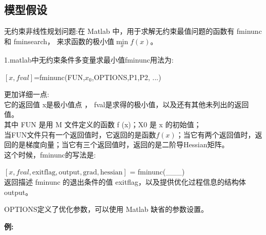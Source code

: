\documentclass[a4paper,20pt]{article}
\begin{document}
    \subsection{模型假设}
    无约束非线性规划问题:在 Matlab 中，用于求解无约束最值问题的函数有 fminunc 和 fminsearch，
    来求函数的极小值$\min\limits_x f(x)$。
    \par 1.matlab中无约束条件多变量求最小值fminunc用法为:
    \begin{center}
        $\left[x,fval\right]$=fminunc(FUN,$x_0$,OPTIONS,P1,P2, ...)
    \end{center}
    \par \noindent 更加详细一点:
    \\它的返回值 x是极小值点 ， fval是求得的极小值，以及还有其他未列出的返回值。
    \\其中 FUN 是用 M 文件定义的函数 f (x)；X0 是 x 的初始值；
    \\当FUN文件只有一个返回值时，它返回的是函数$f(x)$；当它有两个返回值时，返回的是梯度向量；当它有三个返回值时，返回的是二阶导Hessian矩阵。
    \\这个时候，fminunc的写法是:
    \begin{center}
        \par \noindent $\left[x,fval,\text{exitflag},\text{output},\text{grad},\text{hessian}\right]$  = fminunc(\_\_\_)
        \\返回描述 fminunc 的退出条件的值 exitflag，以及提供优化过程信息的结构体 output。
    \end{center}
    \par \noindent OPTIONS定义了优化参数，可以使用 Matlab 缺省的参数设置。
    \par \textbf{例:}
    \par \noindent {}
\end{document}
